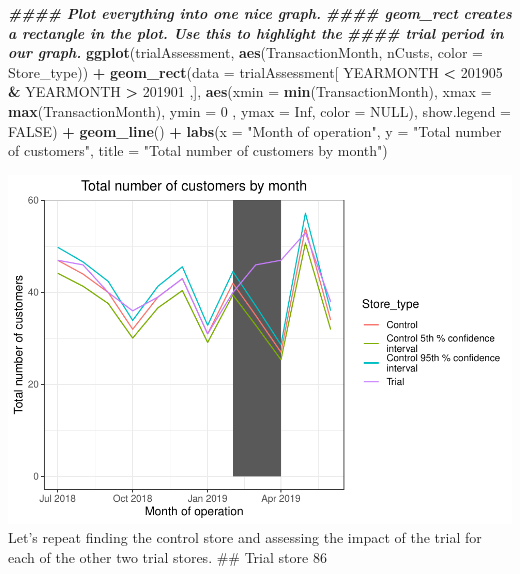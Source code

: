 \documentclass[
]{article}
\newenvironment{Shaded}{\begin{snugshade}}{\end{snugshade}}
\newcommand{\AttributeTok}[1]{\textcolor[rgb]{0.13,0.29,0.53}{#1}}
\newcommand{\ConstantTok}[1]{\textcolor[rgb]{0.56,0.35,0.01}{#1}}
\newcommand{\DecValTok}[1]{\textcolor[rgb]{0.00,0.00,0.81}{#1}}
\newcommand{\DocumentationTok}[1]{\textcolor[rgb]{0.56,0.35,0.01}{\textbf{\textit{#1}}}}
\newcommand{\FunctionTok}[1]{\textcolor[rgb]{0.13,0.29,0.53}{\textbf{#1}}}
\newcommand{\NormalTok}[1]{#1}
\newcommand{\SpecialCharTok}[1]{\textcolor[rgb]{0.81,0.36,0.00}{\textbf{#1}}}
\newcommand{\StringTok}[1]{\textcolor[rgb]{0.31,0.60,0.02}{#1}}
\begin{document}
\begin{Shaded}
\begin{Highlighting}[]
\DocumentationTok{\#\#\#\# Plot everything into one nice graph.}
\DocumentationTok{\#\#\#\# geom\_rect creates a rectangle in the plot. Use this to highlight the}
\DocumentationTok{\#\#\#\# trial period in our graph.}
\FunctionTok{ggplot}\NormalTok{(trialAssessment, }\FunctionTok{aes}\NormalTok{(TransactionMonth, nCusts, }\AttributeTok{color =}\NormalTok{ Store\_type)) }\SpecialCharTok{+} 
  \FunctionTok{geom\_rect}\NormalTok{(}\AttributeTok{data =}\NormalTok{ trialAssessment[ YEARMONTH }\SpecialCharTok{\textless{}} \DecValTok{201905} \SpecialCharTok{\&}\NormalTok{ YEARMONTH }\SpecialCharTok{\textgreater{}} \DecValTok{201901}\NormalTok{ ,],}
\FunctionTok{aes}\NormalTok{(}\AttributeTok{xmin =} \FunctionTok{min}\NormalTok{(TransactionMonth), }\AttributeTok{xmax =} \FunctionTok{max}\NormalTok{(TransactionMonth), }\AttributeTok{ymin =} \DecValTok{0}\NormalTok{ ,}
\AttributeTok{ymax =} \ConstantTok{Inf}\NormalTok{, }\AttributeTok{color =} \ConstantTok{NULL}\NormalTok{), }\AttributeTok{show.legend =} \ConstantTok{FALSE}\NormalTok{) }\SpecialCharTok{+} 
  \FunctionTok{geom\_line}\NormalTok{() }\SpecialCharTok{+} \FunctionTok{labs}\NormalTok{(}\AttributeTok{x =} \StringTok{"Month of operation"}\NormalTok{, }\AttributeTok{y =} \StringTok{"Total number of customers"}\NormalTok{, }\AttributeTok{title =} \StringTok{"Total number of customers by month"}\NormalTok{)}
\end{Highlighting}
\end{Shaded}

\includegraphics{InsideSherpa_Task2_files/figure-latex/unnamed-chunk-15-1}
Let's repeat finding the control store and assessing the impact of the
trial for each of the other two trial stores. \#\# Trial store 86
\end{document}
